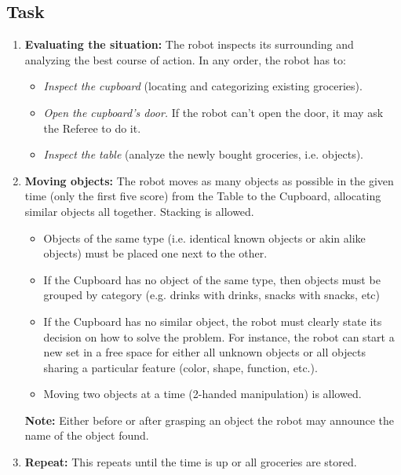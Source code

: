 \subsection{Task}
\begin{enumerate}
	\item \textbf{Evaluating the situation:} The robot inspects its surrounding and analyzing the best course of action. In any order, the robot has to:
	\begin{itemize}
		\item \textit{Inspect the cupboard} (locating and categorizing existing groceries).
		\item \textit{Open the cupboard's door.} If the robot can't open the door, it may ask the Referee to do it.
		\item \textit{Inspect the table} (analyze the newly bought groceries, i.e. objects).
	\end{itemize}

	\item \textbf{Moving objects:} The robot moves as many objects as possible in the given time
	(only the first five score)
	from the Table to the Cupboard, allocating similar objects all together.
	Stacking is allowed.
	\begin{itemize}
		\item Objects of the same type (i.e. identical known objects or akin alike objects) must be placed one next to the other.
		\item If the Cupboard has no object of the same type, then objects must be grouped by category (e.g. drinks with drinks, snacks with snacks, etc)
		\item If the Cupboard has no similar object, the robot must clearly state its decision on how to solve the problem. For instance, the robot can start a new set in a free space for either all unknown objects or all objects sharing a particular feature (color, shape, function, etc.).
		\item Moving two objects at a time (2-handed manipulation) is allowed.
	\end{itemize}

	\textbf{Note:} Either before or after grasping an object the robot may announce the name of the object found.
	\item \textbf{Repeat:} This repeats until the time is up or all groceries are stored.
\end{enumerate}



%
%
